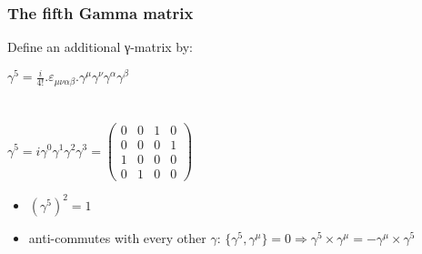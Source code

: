 \label{The fifth Gamma matrix}
\begin{frame}\frametitle{The fifth Gamma matrix}

Define an additional γ-matrix by:\\

\begin{center}
 $\gamma ^{5}={\frac {i}{4!}} . \varepsilon _{\mu \nu \alpha \beta }.\gamma ^{\mu }\gamma ^{\nu }\gamma ^{\alpha }\gamma ^{\beta }$
\\
\\
\\ 
${\displaystyle \gamma ^{5}=i\gamma ^{0}\gamma ^{1}\gamma ^{2}\gamma ^{3}={\begin{pmatrix}0&0&1&0\\0&0&0&1\\1&0&0&0\\0&1&0&0\end{pmatrix}}}$

 
\end{center}


\begin{itemize}
 \item  $(\gamma^5)^2 = 1$
\item anti-commutes with every other $\gamma$:
$\{\gamma^5,\gamma^\mu\}=0 \Longrightarrow \gamma^5\times \gamma^\mu = - \gamma^\mu \times \gamma^5 $
 
\end{itemize}




\end{frame}



\label{The fifth Gamma matrix}

